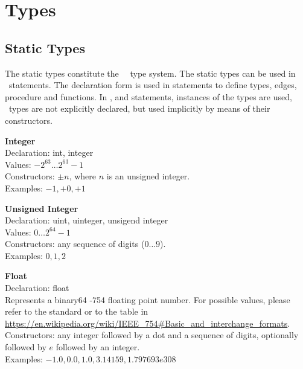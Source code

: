 \section{Types}
\subsection{Static Types}
The static types constitute the \nowdb\ \sql\ type system.
The static types can be used in \sql\ statements.
The declaration form is used in  statements
to define types, edges, procedure and functions.
In ,  and  statements,
instances of the types are used, \ie\
types are not explicitly declared, but used implicitly
by means of their constructors.

\begin{minipage}{\textwidth}
\textbf{Integer}\\
Declaration: int, integer \\
Values: $-2^{63} \dots 2^{63}-1$ \\
Constructors: $\pm n$, where $n$ is an unsigned integer.\\
Examples: $-1, +0, +1$
\end{minipage}

\begin{minipage}{\textwidth}
\textbf{Unsigned Integer} \\
Declaration: uint, uinteger, unsigend integer \\
Values: $0 \dots 2^{64}-1$  \\
Constructors: any sequence of digits ($0\dots9$). \\
Examples: $0, 1, 2$ 
\end{minipage}

\begin{minipage}{\textwidth}
\textbf{Float} \\
Declaration: float \\
Represents a binary64 -754 floating point number.
For possible values, please refer to the standard or to the table in
\url{https://en.wikipedia.org/wiki/IEEE\_754#Basic\_and\_interchange\_formats}.\\
Constructors: any integer followed by a dot and a sequence of digits,
              optionally followed by $e$ followed by an integer.
               \\
Examples: $-1.0, 0.0, 1.0, 3.14159, 1.797693e308$ 
\end{minipage}

